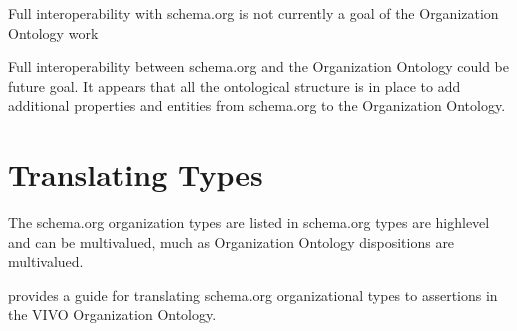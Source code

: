 \documentclass[letterpaper,10pt,english]{sphinxmanual}
\begin{document}
\sphinxAtStartPar
Full interoperability with schema.org is not currently a goal of the Organization
Ontology work \sphinxstepexplicit %
\begin{footnote}[1]\label{\thesphinxscope.1}%
\sphinxAtStartFootnote
Full interoperability between schema.org and the Organization Ontology could be
future goal.  It appears that all the ontological structure is in place to add
additional
properties and entities from schema.org to the Organization Ontology.
%
\end{footnote}


\section{Translating Types}
\label{\detokenize{schema-to-org:translating-types}}
\sphinxAtStartPar
The schema.org organization types are listed in {\hyperref[\detokenize{schema-to-org:table-19}]{}}  schema.org types are
high\sphinxhyphen{}level and can
be multi\sphinxhyphen{}valued, much as Organization Ontology dispositions are multi\sphinxhyphen{}valued.

\sphinxAtStartPar
{\hyperref[\detokenize{schema-to-org:table-19}]{}} provides a guide for translating schema.org organizational types to assertions
in the VIVO Organization Ontology.
\end{document}

